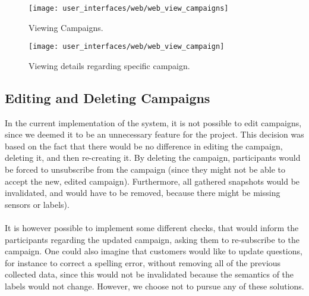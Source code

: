 \begin{figure}[!htbp]
\centering
\texttt{[image: user\_interfaces/web/web\_view\_campaigns]}
\caption{Viewing Campaigns.}
\label{fig:web_view_campaigns}
\end{figure}
\FloatBarrier

\begin{figure}[!htbp]
\centering
\texttt{[image: user\_interfaces/web/web\_view\_campaign]}
\caption{Viewing details regarding specific campaign.}
\label{fig:web_view_campaign}
\end{figure}
\FloatBarrier

\subsection{Editing and Deleting Campaigns}

In the current implementation of the system, it is not possible to edit campaigns, since we deemed it to be an unnecessary feature for the project. This decision was based on the fact that there would be no difference in editing the campaign, deleting it, and then re-creating it. By deleting the campaign, participants would be forced to unsubscribe from the campaign (since they might not be able to accept the new, edited campaign). Furthermore, all gathered snapshots would be invalidated, and would have to be removed, because there might be missing sensors or labels).
\\\\
It is however possible to implement some different checks, that would inform the participants regarding the updated campaign, asking them to re-subscribe to the campaign. One could also imagine that customers would like to update questions, for instance to correct a spelling error, without removing all of the previous collected data, since this would not be invalidated because the semantics of the labels would not change. However, we choose not to pursue any of these solutions.


